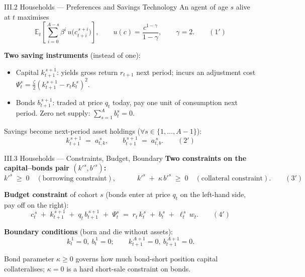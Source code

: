 \documentclass[aspectratio=169,11pt]{beamer}
\newcommand{\emphc}[1]{\textcolor{harvardcrimson}{#1}}
\begin{document}
\begin{frame}{III.2 Households --- Preferences and Savings Technology}
\small
An agent of age $s$ alive at $t$ maximises
\[
\mathbb{E}_t\!\left[\sum_{i=0}^{A-s} \beta^i \,u\!\bigl(c_{t+i}^{\,s+i}\bigr)\right], \qquad u(c) = \frac{c^{1-\gamma}}{1-\gamma}, \qquad \gamma = 2. \qquad (1')
\]

\vspace{0.3em}
\textbf{Two saving instruments} (instead of one):
\begin{itemize}\itemsep2pt
    \item \emphc{Capital} $k_{t+1}^{\,s+1}$: yields gross return $r_{t+1}$ next period; incurs an \emphc{adjustment cost} $\Psi_t^s = \tfrac{\zeta}{2}(k_{t+1}^{\,s+1} - r_t k_t^{\,s})^2$.
    \item \emphc{Bonds} $b_{t+1}^{\,s+1}$: traded at price $q_t$ today, pay one unit of consumption next period. \emphc{Zero net supply}: $\sum_{s=1}^A b_t^s = 0$.
\end{itemize}

\vspace{0.3em}
Savings become next-period asset holdings ($\forall s \in \{1, \ldots, A-1\}$):
\[
k_{t+1}^{\,s+1} \;=\; a_{t,k}^{\,s}, \qquad b_{t+1}^{\,s+1} \;=\; a_{t,b}^{\,s}. \qquad (2')
\]
\end{frame}


\begin{frame}{III.3 Households --- Constraints, Budget, Boundary}
\small
\textbf{Two constraints on the capital--bonds pair $(k'^s, b'^s)$:}
\[
k'^s \;\ge\; 0 \quad (\text{borrowing constraint}), \qquad\quad
k'^s \;+\; \kappa\, b'^s \;\ge\; 0 \quad (\text{collateral constraint}).
\qquad (3')
\]

\vspace{0.4em}
\textbf{Budget constraint} of cohort $s$ (bonds enter at price $q_t$ on the left-hand side, pay off on the right):
\[
c_t^{\,s} \;+\; k_{t+1}^{\,s+1} \;+\; q_t\, b_{t+1}^{\,s+1} \;+\; \Psi_t^s
\;=\; r_t\, k_t^{\,s} \;+\; b_t^{\,s} \;+\; \ell_t^{\,s}\, w_t.
\qquad (4')
\]

\vspace{0.4em}
\textbf{Boundary conditions} (born and die without assets):
\[
k_t^{\,1} = 0,\ b_t^{\,1} = 0; \qquad k_{t+1}^{\,A+1} = 0,\ b_{t+1}^{\,A+1} = 0.
\]

\vspace{0.3em}
{\footnotesize Bond parameter $\kappa \ge 0$ governs how much bond-short position capital collateralises; $\kappa = 0$ is a \emphc{hard} short-sale constraint on bonds.}
\end{frame}
\end{document}
